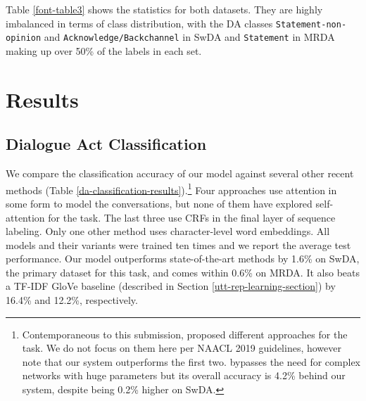 \documentclass[11pt,a4paper]{article}
\begin{document}
Table {\ref{font-table3}} shows the statistics for both datasets.
They are highly imbalanced in terms of class distribution, with the DA classes \texttt{Statement-non-opinion} and \texttt{Acknowledge/Backchannel} in SwDA and \texttt{Statement} in MRDA making up over 50\% of the labels in each set.

\section{Results}

\subsection{Dialogue Act Classification}

We compare the classification accuracy of our model against several other recent methods  (Table {\ref{da-classification-results}}).\footnote{Contemporaneous to this submission, \cite{li2018dual, wan2018improved, ravi2018self} proposed different approaches for the task. We do not focus on them here per NAACL 2019 guidelines, however note that our system outperforms the first two.  \cite{ravi2018self} bypasses the need for complex networks with huge parameters but its overall accuracy is 4.2\% behind our system, despite being 0.2\% higher on SwDA.}  
Four approaches \cite{chen2017dialogue,tran2017hierarchical,ortega2017neural,shen2016neural} use attention in some form to model the conversations, but none of them have explored self-attention for the task. The last three use CRFs in the final layer of sequence labeling. Only one other method \cite{chen2017dialogue} uses character-level word embeddings. All models and their variants were trained ten times and we report the average test performance. Our model outperforms state-of-the-art methods by 1.6\% on SwDA, the primary dataset for this task, and comes within 0.6\% on MRDA.  It also beats a TF-IDF GloVe baseline (described in Section \ref{utt-rep-learning-section}) by 16.4\% and 12.2\%, respectively. 
\end{document}
